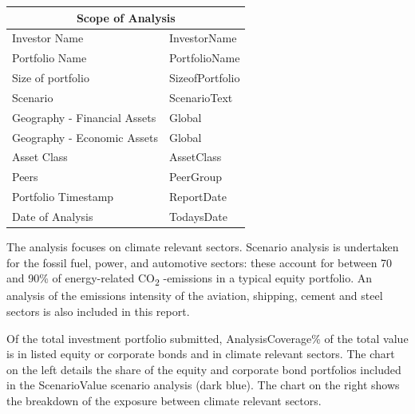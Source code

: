 \documentclass[10pt,table,a4]{article}\usepackage[]{graphicx}\usepackage[]{color}
\begin{document}
\begin{multicols}{2}
		
		\begin{center}
			{
				\setlength{\tabcolsep}{10pt} %
				\renewcommand{\arraystretch}{1.5} %
				\begin{tabular}{ p{.35\linewidth} p{.49\linewidth} }
					\hline
					\multicolumn{2}{c}{\textbf{Scope of Analysis}} \\
					\hline
					Investor Name & InvestorName \\ 
					Portfolio Name & PortfolioName \\ 
					Size of portfolio & SizeofPortfolio \\ 
					Scenario & ScenarioText \\ 
					Geography - \newline Financial Assets & Global \\ 
					Geography - \newline Economic Assets & Global \\ 
					Asset Class & AssetClass \\ 
					Peers & PeerGroup \\
					Portfolio Timestamp & ReportDate \\ 
					Date of Analysis & TodaysDate \\ 
					\hline
				\end{tabular}
			}
			
		\end{center}
	
		The analysis focuses on climate relevant sectors. Scenario analysis is undertaken for the fossil fuel, power, and automotive sectors: these account for between 70 and 90\% of energy-related CO\textsubscript{2} -emissions in a typical equity portfolio. An analysis of the emissions intensity of the aviation, shipping, cement and steel sectors is also included in this report.
		
	Of the total investment portfolio submitted, AnalysisCoverage\% of the total value is in listed equity or corporate bonds and in climate relevant sectors. The chart on the left details the share of the equity and corporate bond portfolios included in the ScenarioValue scenario analysis (dark blue). The chart on the right shows the breakdown of the exposure between climate relevant sectors.
		
		

		
		\vspace{1.2cm}
		
		
	\end{multicols}	
	
\end{document}
